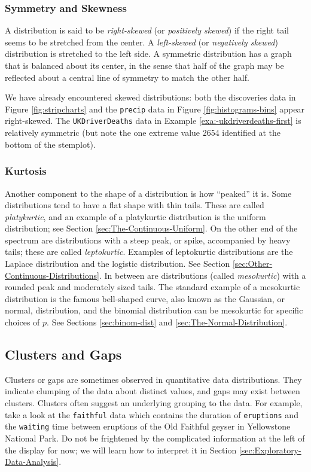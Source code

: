 \documentclass[captions=tableheading]{scrbook}
\begin{document}
\subsubsection{Symmetry and Skewness}
\label{sec-2-2-3-1}


A distribution is said to be \emph{right-skewed} (or \emph{positively skewed}) if the right tail seems to be stretched from the center. A \emph{left-skewed} (or \emph{negatively skewed}) distribution is stretched to the left side. A symmetric distribution has a graph that is balanced about its center, in the sense that half of the graph may be reflected about a central line of symmetry to match the other
half.

We have already encountered skewed distributions: both the discoveries data in Figure \ref{fig:stripcharts} and the \texttt{precip} data in Figure \ref{fig:histograms-bins} appear right-skewed. The \texttt{UKDriverDeaths} data in Example \ref{exa:-ukdriverdeaths-first} is relatively symmetric (but note the one extreme value 2654 identified at the bottom of the stemplot).
\subsubsection{Kurtosis}
\label{sec-2-2-3-2}


Another component to the shape of a distribution is how ``peaked'' it is. Some distributions tend to have a flat shape with thin tails. These are called \emph{platykurtic}, and an example of a platykurtic distribution is the uniform distribution; see Section \ref{sec:The-Continuous-Uniform}. On the other end of the spectrum are distributions with a steep peak, or spike, accompanied by heavy tails; these are called \emph{leptokurtic}. Examples of leptokurtic distributions are the Laplace distribution and the logistic distribution. See Section \ref{sec:Other-Continuous-Distributions}. In between are distributions (called \emph{mesokurtic}) with a rounded peak and moderately sized tails. The standard example of a mesokurtic distribution is the famous bell-shaped curve, also known as the Gaussian, or normal, distribution, and the binomial distribution can be mesokurtic for specific choices of \(p\). See Sections \ref{sec:binom-dist} and \ref{sec:The-Normal-Distribution}.
\subsection{Clusters and Gaps}
\label{sec-2-2-4}
\label{sub:clusters-and-gaps}


Clusters or gaps are sometimes observed in quantitative data distributions. They indicate clumping of the data about distinct values, and gaps may exist between clusters. Clusters often suggest an underlying grouping to the data. For example, take a look at the \texttt{faithful} data which contains the duration of \texttt{eruptions} and the \texttt{waiting} time between eruptions of the Old Faithful geyser in Yellowstone National Park. Do not be frightened by the complicated information at the left of the display for now; we will learn how to interpret it in Section \ref{sec:Exploratory-Data-Analysis}.
\end{document}
